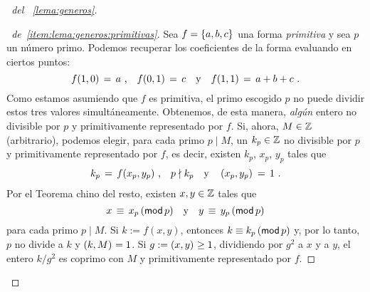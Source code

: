 \begin{proof}[\proofname~del \lemaname~\ref{lema:generos}]
	\begin{proof}[\proofname~de~\ref{item:lema:generos:primitivas}]
		Sea $f=\binaria{a,b,c}$ una forma \emph{primitiva}
		y sea $p$ un n\'umero primo. Podemos recuperar los
		coeficientes de la forma evaluando en ciertos puntos:
		\begin{displaymath}
			f(1,0)\,=\,a\dispcomma\quad
			f(0,1)\,=\,c\dispand
			f(1,1)\,=\,a+b+c
			\dispstop
		\end{displaymath}
		Como estamos asumiendo que $f$ es primitiva, el primo
		escogido $p$ no puede dividir estos tres valores
		simult\'aneamente. Obtenemos, de esta manera,
		\emph{alg\'un} entero no divisible por $p$ y primitivamente
		representado por $f$.
		Si, ahora, $M\in\Enteros$ (arbitrario), podemos elegir,
		para cada primo $p\mid M$, un $k_p\in\Enteros$ no divisible
		por $p$ y primitivamente representado por $f$, es decir,
		existen $k_p$, $x_p$, $y_p$ tales que
		\begin{displaymath}
			k_p\,=\,f(x_p,y_p)\dispcomma\quad
			p\nmid k_p\dispand
			\mcd{x_p,y_p}\,=\,1
			\dispstop
		\end{displaymath}
		Por el Teorema chino del resto, existen $x,y\in\Enteros$
		tales que
		\begin{displaymath}
			x\,\equiv\,x_p\tmodulo[p]
			\dispand
			y\,\equiv\,y_p\tmodulo[p]
		\end{displaymath}
		para cada primo $p\mid M$. Si $k:=f(x,y)$, entonces
		$k\equiv k_p\tmodulo[p]$ y, por lo tanto,
		$p$ no divide a $k$ y $\mcd{k,M}=1$.
		Si $g:=\mcd{x,y}\geq 1$, dividiendo por $g^2$ a $x$ y a $y$,
		el entero $k/g^2$ es coprimo con $M$ y primitivamente
		representado por $f$.
	\end{proof}


\end{proof}
